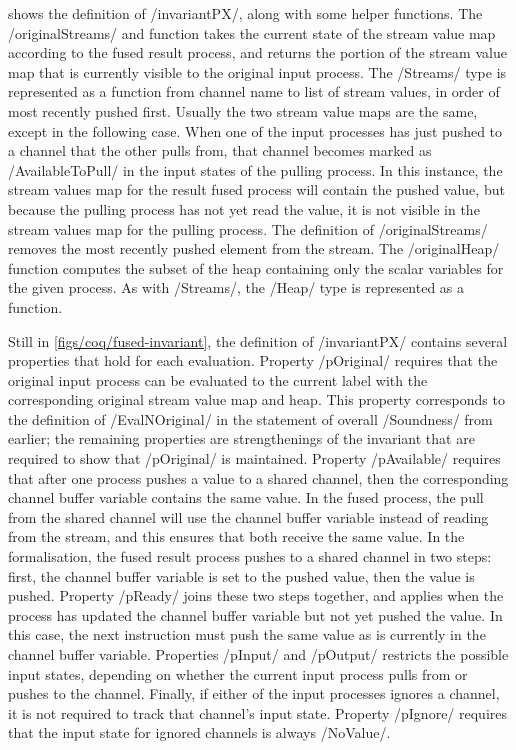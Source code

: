  shows the definition of \Hs/invariantPX/, along with some helper functions.
The \Hs/originalStreams/ and function takes the current state of the stream value map according to the fused result process, and returns the portion of the stream value map that is currently visible to the original input process.
The \Hs/Streams/ type is represented as a function from channel name to list of stream values, in order of most recently pushed first.
Usually the two stream value maps are the same, except in the following case.
When one of the input processes has just pushed to a channel that the other pulls from, that channel becomes marked as \Hs/AvailableToPull/ in the input states of the pulling process.
In this instance, the stream values map for the result fused process will contain the pushed value, but because the pulling process has not yet read the value, it is not visible in the stream values map for the pulling process.
The definition of \Hs/originalStreams/ removes the most recently pushed element from the stream.
The \Hs/originalHeap/ function computes the subset of the heap containing only the scalar variables for the given process. As with \Hs/Streams/, the \Hs/Heap/ type is represented as a function.

Still in \cref{figs/coq/fused-invariant}, the definition of \Hs/invariantPX/ contains several properties that hold for each evaluation.
Property \Hs/pOriginal/ requires that the original input process can be evaluated to the current label with the corresponding original stream value map and heap.
This property corresponds to the definition of \Hs/EvalNOriginal/ in the statement of overall \Hs/Soundness/ from earlier; the remaining properties are strengthenings of the invariant that are required to show that \Hs/pOriginal/ is maintained.
Property \Hs/pAvailable/ requires that after one process pushes a value to a shared channel, then the corresponding channel buffer variable contains the same value.
In the fused process, the pull from the shared channel will use the channel buffer variable instead of reading from the stream, and this ensures that both receive the same value.
In the formalisation, the fused result process pushes to a shared channel in two steps: first, the channel buffer variable is set to the pushed value, then the value is pushed.
Property \Hs/pReady/ joins these two steps together, and applies when the process has updated the channel buffer variable but not yet pushed the value.
In this case, the next instruction must push the same value as is currently in the channel buffer variable.
Properties \Hs/pInput/ and \Hs/pOutput/ restricts the possible input states, depending on whether the current input process pulls from or pushes to the channel.
Finally, if either of the input processes ignores a channel, it is not required to track that channel's input state. 
Property \Hs/pIgnore/ requires that the input state for ignored channels is always \Hs/NoValue/.

